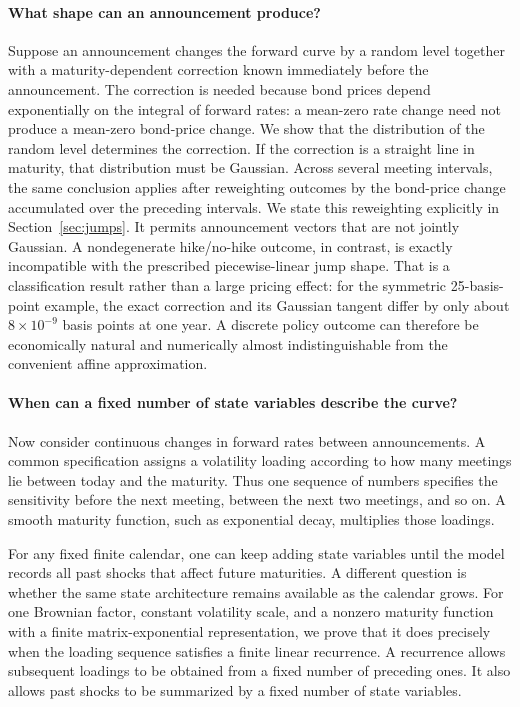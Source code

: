 \paragraph{What shape can an announcement produce?}
Suppose an announcement changes the forward curve by a random level together with a maturity-dependent correction known immediately before the announcement. The correction is needed because bond prices depend exponentially on the integral of forward rates: a mean-zero rate change need not produce a mean-zero bond-price change. We show that the distribution of the random level determines the correction. If the correction is a straight line in maturity, that distribution must be Gaussian. Across several meeting intervals, the same conclusion applies after reweighting outcomes by the bond-price change accumulated over the preceding intervals. We state this reweighting explicitly in Section~\ref{sec:jumps}. It permits announcement vectors that are not jointly Gaussian. A nondegenerate hike/no-hike outcome, in contrast, is exactly incompatible with the prescribed piecewise-linear jump shape. That is a classification result rather than a large pricing effect: for the symmetric 25-basis-point example, the exact correction and its Gaussian tangent differ by only about $8\times10^{-9}$ basis points at one year. A discrete policy outcome can therefore be economically natural and numerically almost indistinguishable from the convenient affine approximation.

\paragraph{When can a fixed number of state variables describe the curve?}
Now consider continuous changes in forward rates between announcements. A common specification assigns a volatility loading according to how many meetings lie between today and the maturity. Thus one sequence of numbers specifies the sensitivity before the next meeting, between the next two meetings, and so on. A smooth maturity function, such as exponential decay, multiplies those loadings.

For any fixed finite calendar, one can keep adding state variables until the model records all past shocks that affect future maturities. A different question is whether the same state architecture remains available as the calendar grows. For one Brownian factor, constant volatility scale, and a nonzero maturity function with a finite matrix-exponential representation, we prove that it does precisely when the loading sequence satisfies a finite linear recurrence. A recurrence allows subsequent loadings to be obtained from a fixed number of preceding ones. It also allows past shocks to be summarized by a fixed number of state variables.

